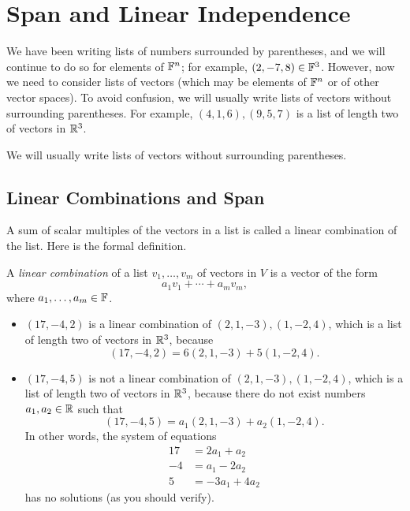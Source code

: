 \providecommand\axeqnum[1]{\refstepcounter{theorem}\tag*{\thetheorem}\label{ax:#1}}
\section{Span and Linear Independence}

We have been writing lists of numbers surrounded by parentheses, and we will
continue to do so for elements of $\mathbb{F}^n$; for example, $(2,-7,8)\in\mathbb{F}^3$.
However, now we need to consider lists of vectors (which may be elements of
$\mathbb{F}^n$ or of other vector spaces). To avoid confusion, we will usually write
lists of vectors without surrounding parentheses. For example,
$(4,1,6),(9,5,7)$ is a list of length two of vectors in $\mathbb{R}^3$.

\begin{notation}\label{ax:2.1}
We will usually write lists of vectors without surrounding parentheses.
\end{notation}

\subsection{Linear Combinations and Span}

A sum of scalar multiples of the vectors in a list is called a linear
combination of the list. Here is the formal definition.

\begin{definition}\label{ax:2.2}
A \emph{linear combination} of a list $v_1,\dots,v_m$ of vectors in $V$ is a
vector of the form
\[ a_1v_1+\cdots+a_mv_m, \]
where $a_1,\dots,a_m\in\mathbb{F}$.
\end{definition}

\begin{example}\label{ax:2.3}\leavevmode
\begin{itemize}
\item $(17,-4,2)$ is a linear combination of $(2,1,-3),(1,-2,4)$, which is a
  list of length two of vectors in $\mathbb{R}^3$, because
  \[ (17,-4,2) = 6(2,1,-3)+5(1,-2,4). \]
\item $(17,-4,5)$ is not a linear combination of $(2,1,-3),(1,-2,4)$, which is
  a list of length two of vectors in $\mathbb{R}^3$, because there do not exist numbers
  $a_1,a_2\in\mathbb{R}$ such that
  \[ (17,-4,5) = a_1(2,1,-3)+a_2(1,-2,4). \]
  In other words, the system of equations
  \begin{align*}
    17 &= 2a_1+a_2\\
    -4 &= a_1-2a_2\\
     5 &= -3a_1+4a_2
  \end{align*}
  has no solutions (as you should verify).
\end{itemize}
\end{example}

